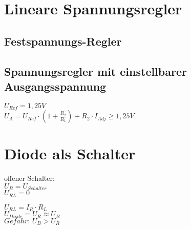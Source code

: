 \section{Lineare Spannungsregler}
    \begin{minipage}{0.4\columnwidth}    
        \subsection{Festspannungs-Regler}
    \end{minipage}
    \begin{minipage}{0.6\columnwidth}    
        \subsection{Spannungsregler mit einstellbarer Ausgangsspannung}
            \begin{flushright}
                $U_{Ref}=1,25V$\\
                $U_A=U_{Ref}\cdot (1+\frac{R_2}{R_1})+R_2\cdot I_{Adj} \geq 1,25V$    
            \end{flushright}
    \end{minipage}
\section{Diode als Schalter}
    \begin{minipage}{0.2\columnwidth}
        offener Schalter:\\
        $U_B=U_{Schalter}$\\
        $U_{RL}=0$
    \end{minipage}
    \begin{minipage}{0.5\columnwidth}
    \end{minipage}
    \begin{minipage}{0.3\columnwidth}
        $U_{RL}=I_R\cdot R_L$\\
        $U_{Diode}=U_R\approx U_B$\\
        $Gefahr:\, U_B>U_R$
    \end{minipage}


